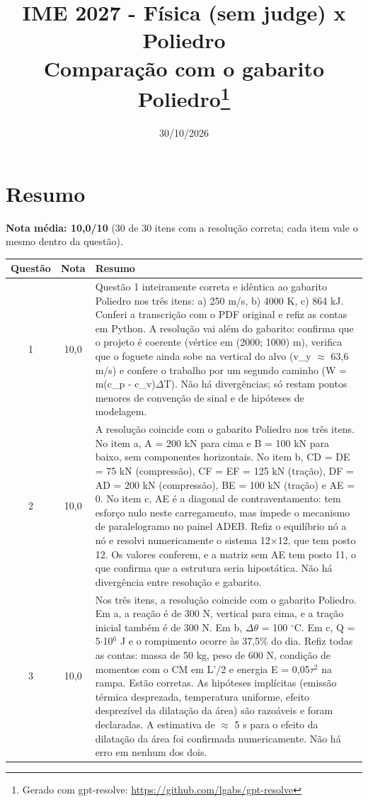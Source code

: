 \documentclass{article}%
\title{IME 2027 {-} Física (sem judge) x Poliedro\\[4pt]\large Comparação com o gabarito Poliedro\thanks{Gerado com gpt-resolve: \url{https://github.com/lgabs/gpt-resolve}}}%
\date{30/10/2026}%
\begin{document}
%
\normalsize%
\maketitle%
\section*{Resumo}\textbf{Nota média: 10,0/10} (30 de 30 itens com a resolução correta; cada item vale o mesmo dentro da questão).\par\medskip%
\begin{longtable}{@{}c c p{}@{}}\toprule Questão & Nota & Resumo \\ \midrule
1 & 10,0 & Questão 1 inteiramente correta e idêntica ao gabarito Poliedro nos três itens: a) 250 m/s, b) 4000 K, c) 864 kJ. Conferi a transcrição com o PDF original e refiz as contas em Python. A resolução vai além do gabarito: confirma que o projeto é coerente (vértice em (2000; 1000) m), verifica que o foguete ainda sobe na vertical do alvo (v\_y $\approx$ 63,6 m/s) e confere o trabalho por um segundo caminho (W = m(c\_p - c\_v)$\Delta$T). Não há divergências; só restam pontos menores de convenção de sinal e de hipóteses de modelagem. \\
2 & 10,0 & A resolução coincide com o gabarito Poliedro nos três itens. No item a, A = 200 kN para cima e B = 100 kN para baixo, sem componentes horizontais. No item b, CD = DE = 75 kN (compressão), CF = EF = 125 kN (tração), DF = AD = 200 kN (compressão), BE = 100 kN (tração) e AE = 0. No item c, AE é a diagonal de contraventamento: tem esforço nulo neste carregamento, mas impede o mecanismo de paralelogramo no painel ADEB. Refiz o equilíbrio nó a nó e resolvi numericamente o sistema 12$\times$12, que tem posto 12. Os valores conferem, e a matriz sem AE tem posto 11, o que confirma que a estrutura seria hipostática. Não há divergência entre resolução e gabarito. \\
3 & 10,0 & Nos três itens, a resolução coincide com o gabarito Poliedro. Em a, a reação é de 300 N, vertical para cima, e a tração inicial também é de 300 N. Em b, $\Delta$$\theta$ = 100 $^\circ$C. Em c, Q = 5$\cdot$10$^{6}$ J e o rompimento ocorre às 37,5\% do dia. Refiz todas as contas: massa de 50 kg, peso de 600 N, condição de momentos com o CM em L'/2 e energia E = 0,05$\tau$$^2$ na rampa. Estão corretas. As hipóteses implícitas (emissão térmica desprezada, temperatura uniforme, efeito desprezível da dilatação da área) são razoáveis e foram declaradas. A estimativa de $\approx$ 5 s para o efeito da dilatação da área foi confirmada numericamente. Não há erro em nenhum dos dois. \\

\end{longtable}
\end{document}
